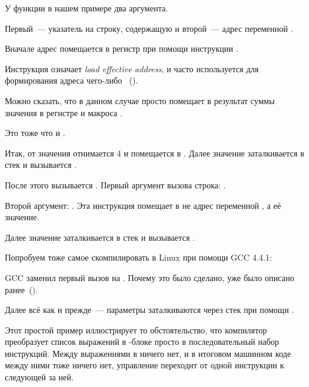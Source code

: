 У функции \scanf в нашем примере два аргумента.

Первый~--- указатель на строку, содержащую  и второй~--- адрес переменной .

Вначале адрес  помещается в регистр \EAX при помощи инструкции .

Инструкция \LEA означает \emph{load effective address}, и часто используется для формирования адреса чего-либо ~().

Можно сказать, что в данном случае \LEA просто помещает в \EAX результат суммы значения в регистре \EBP и макроса .

Это тоже что и .

Итак, от значения \EBP отнимается 4 и помещается в \EAX.
Далее значение \EAX заталкивается в стек и вызывается \scanf.

После этого вызывается \printf. Первый аргумент вызова строка:
.

Второй аргумент: .
Эта инструкция помещает в \ECX не адрес переменной , а её значение.

Далее значение \ECX заталкивается в стек и вызывается \printf.




Попробуем тоже самое скомпилировать в Linux при помощи GCC 4.4.1:



GCC заменил первый вызов \printf на \puts. Почему это было сделано, 
уже было описано ранее~().

% 


Далее всё как и прежде~--- параметры заталкиваются через стек при помощи \MOV.


Этот простой пример иллюстрирует то обстоятельство, что компилятор преобразует
список выражений в \CCpp-блоке просто в последовательный набор инструкций.
Между выражениями в \CCpp ничего нет, и в итоговом машинном коде между ними тоже ничего нет, 
управление переходит от одной инструкции к следующей за ней.


